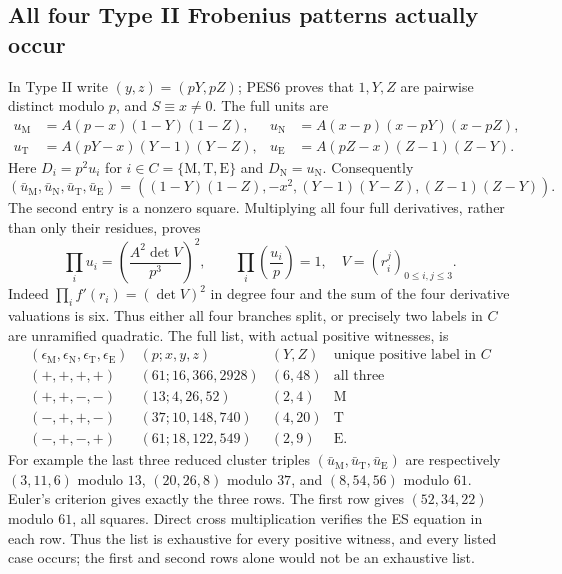 \subsection{All four Type II Frobenius patterns actually occur}
In Type II write $(y,z)=(pY,pZ)$; PES6 proves that $1,Y,Z$ are
pairwise distinct modulo $p$, and $S\equiv x\ne0$. The full units are
\[
\begin{aligned}
 u_{\mathrm M}&=A(p-x)(1-Y)(1-Z),&
 u_{\mathrm N}&=A(x-p)(x-pY)(x-pZ),\\
 u_{\mathrm T}&=A(pY-x)(Y-1)(Y-Z),&
 u_{\mathrm E}&=A(pZ-x)(Z-1)(Z-Y).
\end{aligned}                                                   \tag{SLF7}
\]
Here $D_i=p^2u_i$ for $i\in C=\{\mathrm M,\mathrm T,\mathrm E\}$
and $D_{\mathrm N}=u_{\mathrm N}$. Consequently
\[
 (\bar u_{\mathrm M},\bar u_{\mathrm N},
   \bar u_{\mathrm T},\bar u_{\mathrm E})
 =((1-Y)(1-Z),-x^2,(Y-1)(Y-Z),(Z-1)(Z-Y)).             \tag{SLF8}
\]
The second entry is a nonzero square. Multiplying all four full
derivatives, rather than only their residues, proves
\[
 \prod_i u_i
   =\left(\frac{A^2\det V}{p^3}\right)^2,\qquad
 \prod_i\left(\frac{u_i}p\right)=1,
 \quad V=(r_i^j)_{0\le i,j\le3}.                      \tag{SLF9}
\]
Indeed $\prod_i f'(r_i)=(\det V)^2$ in degree four and the sum
of the four derivative valuations is six. Thus either all four
branches split, or precisely two labels in $C$ are unramified
quadratic. The full list, with actual positive witnesses, is
\[
\begin{array}{c|c|c|c}
 (\epsilon_{\mathrm M},\epsilon_{\mathrm N},
  \epsilon_{\mathrm T},\epsilon_{\mathrm E})
 &(p;x,y,z)&(Y,Z)&\text{unique positive label in }C\\\hline
 (+,+,+,+)&(61;16,366,2928)&(6,48)&\text{all three}\\
 (+,+,-,-)&(13;4,26,52)&(2,4)&\mathrm M\\
 (-,+,+,-)&(37;10,148,740)&(4,20)&\mathrm T\\
 (-,+,-,+)&(61;18,122,549)&(2,9)&\mathrm E.
\end{array}                                                    \tag{SLF10}
\]
For example the last three reduced cluster triples
$(\bar u_{\mathrm M},\bar u_{\mathrm T},\bar u_{\mathrm E})$
are respectively $(3,11,6)$ modulo $13$, $(20,26,8)$ modulo $37$,
and $(8,54,56)$ modulo $61$. Euler's criterion gives exactly the
three rows. The first row gives $(52,34,22)$ modulo $61$, all
squares. Direct cross multiplication verifies the ES equation in
each row. Thus the list is exhaustive for every positive witness,
and every listed case occurs; the first and second rows alone
would not be an exhaustive list.

